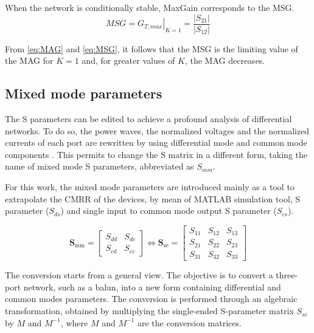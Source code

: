 When the network is conditionally stable, MaxGain corresponds to the MSG. 
\begin{equation}
    MSG=\left.G_{T,max}\right|_{K=1}=\dfrac{|S_{21}|}{|S_{12}|}
    \label{eq:MSG}
\end{equation}

From \eqref{eq:MAG} and \eqref{eq:MSG}, it follows that the MSG is the limiting value of the MAG for $K=1$ and, for greater values of $K$, the MAG decreases.  

\subsection{Mixed mode parameters}
The S parameters can be edited to achieve a profound analysis of differential networks. To do so, the power waves, the normalized voltages and the normalized currents of each port are rewritten by using differential mode and common mode components \cite{Microwave differential circuit design using mixed-mode S-parameters}. This permits to change the S matrix in a different form, 
taking the name of mixed mode S parameters, abbreviated as \textbf{$S_{mm}$}.

For this work, the mixed mode parameters are introduced mainly as a tool to extrapolate the CMRR of the devices, by mean of MATLAB simulation tool, S parameter ($S_{ds}$) and single input to common mode output S parameter ($S_{cs}$).

\begin{equation}
\mathbf{S}_{\mathrm{mm}} =
\begin{bmatrix}
S_{dd} & S_{dc} \\
S_{cd} & S_{cc}
\end{bmatrix}
\iff
\mathbf{S}_{\mathrm{se}} =
\begin{bmatrix}
S_{11} & S_{12} & S_{13} \\
S_{21} & S_{22} & S_{23} \\
S_{31} & S_{32} & S_{33}
\end{bmatrix}
\end{equation}

The conversion starts from a general view. The objective is to convert a three-port network, such as a balun, into a new form containing differential and common modes parameters. The conversion is performed through an algebraic transformation, obtained by multiplying the single-ended S-parameter matrix $S_{se}$ by $M$ and $M^{-1}$, where $M$ and $M^{-1}$ are the conversion matrices.

